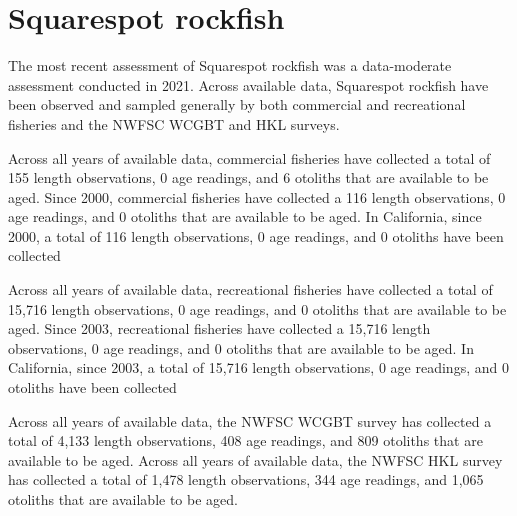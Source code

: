 \documentclass[11pt,
  english,
  letterpaper,
]{article}
\begin{document}

\hypertarget{squarespot-rockfish}{%
\section{Squarespot rockfish}\label{squarespot-rockfish}}

\leavevmode\tagmcend\tagstructend


The most recent assessment of Squarespot rockfish was a data-moderate assessment conducted in 2021. Across available data, Squarespot rockfish have been observed and sampled generally by both commercial and recreational fisheries and the NWFSC WCGBT and HKL surveys.

\leavevmode\tagmcend\tagstructend\par


Across all years of available data, commercial fisheries have collected a total of 155 length observations, 0 age readings, and 6 otoliths that are available to be aged. Since 2000, commercial fisheries have collected a 116 length observations, 0 age readings, and 0 otoliths that are available to be aged. In California, since 2000, a total of 116 length observations, 0 age readings, and 0 otoliths have been collected

\leavevmode\tagmcend\tagstructend\par


Across all years of available data, recreational fisheries have collected a total of 15,716 length observations, 0 age readings, and 0 otoliths that are available to be aged. Since 2003, recreational fisheries have collected a 15,716 length observations, 0 age readings, and 0 otoliths that are available to be aged. In California, since 2003, a total of 15,716 length observations, 0 age readings, and 0 otoliths have been collected

\leavevmode\tagmcend\tagstructend\par


Across all years of available data, the NWFSC WCGBT survey has collected a total of 4,133 length observations, 408 age readings, and 809 otoliths that are available to be aged. Across all years of available data, the NWFSC HKL survey has collected a total of 1,478 length observations, 344 age readings, and 1,065 otoliths that are available to be aged.
\end{document}
